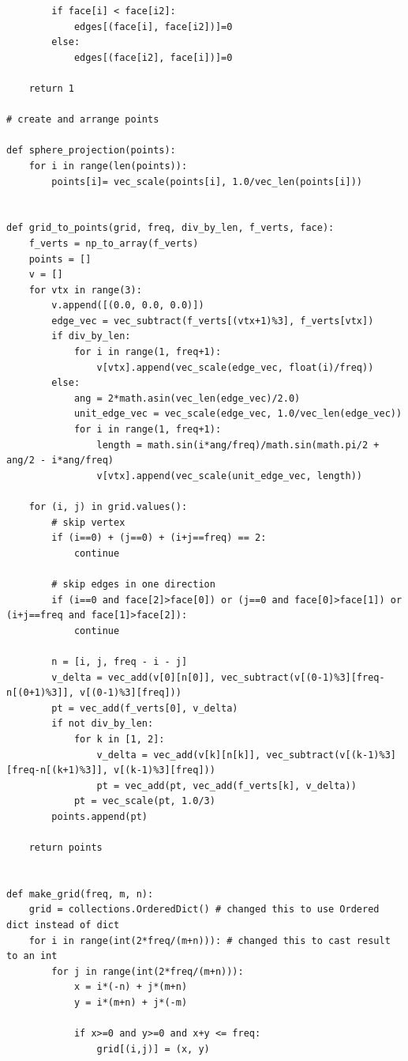 \documentclass{article}
\begin{document}
\begin{verbatim}
        if face[i] < face[i2]:
            edges[(face[i], face[i2])]=0
        else:
            edges[(face[i2], face[i])]=0

    return 1

# create and arrange points

def sphere_projection(points):
    for i in range(len(points)):
        points[i]= vec_scale(points[i], 1.0/vec_len(points[i]))


def grid_to_points(grid, freq, div_by_len, f_verts, face):
    f_verts = np_to_array(f_verts)
    points = []
    v = []
    for vtx in range(3):
        v.append([(0.0, 0.0, 0.0)])
        edge_vec = vec_subtract(f_verts[(vtx+1)%3], f_verts[vtx])
        if div_by_len:
            for i in range(1, freq+1):
                v[vtx].append(vec_scale(edge_vec, float(i)/freq))
        else:
            ang = 2*math.asin(vec_len(edge_vec)/2.0)
            unit_edge_vec = vec_scale(edge_vec, 1.0/vec_len(edge_vec))
            for i in range(1, freq+1):
                length = math.sin(i*ang/freq)/math.sin(math.pi/2 + ang/2 - i*ang/freq)
                v[vtx].append(vec_scale(unit_edge_vec, length))

    for (i, j) in grid.values():
        # skip vertex
        if (i==0) + (j==0) + (i+j==freq) == 2:
            continue

        # skip edges in one direction
        if (i==0 and face[2]>face[0]) or (j==0 and face[0]>face[1]) or (i+j==freq and face[1]>face[2]):
            continue

        n = [i, j, freq - i - j]
        v_delta = vec_add(v[0][n[0]], vec_subtract(v[(0-1)%3][freq-n[(0+1)%3]], v[(0-1)%3][freq]))
        pt = vec_add(f_verts[0], v_delta)
        if not div_by_len:
            for k in [1, 2]:
                v_delta = vec_add(v[k][n[k]], vec_subtract(v[(k-1)%3][freq-n[(k+1)%3]], v[(k-1)%3][freq]))
                pt = vec_add(pt, vec_add(f_verts[k], v_delta))
            pt = vec_scale(pt, 1.0/3)
        points.append(pt)

    return points


def make_grid(freq, m, n):
    grid = collections.OrderedDict() # changed this to use Ordered dict instead of dict
    for i in range(int(2*freq/(m+n))): # changed this to cast result to an int
        for j in range(int(2*freq/(m+n))):
            x = i*(-n) + j*(m+n)
            y = i*(m+n) + j*(-m)

            if x>=0 and y>=0 and x+y <= freq:
                grid[(i,j)] = (x, y)


\end{verbatim}
\end{document}

